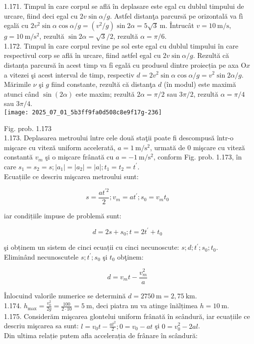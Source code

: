1.171. Timpul în care corpul se află în deplasare este egal cu dublul timpului de urcare, fiind deci egal cu $2 v \sin \alpha / g$. Astfel distanţa parcursă pe orizontală va fì egală cu $2 v^{2} \sin \alpha \cos \alpha / g=\left(v^{2} / g\right) \sin 2 \alpha=5 \sqrt{3} \mathrm{~m}$. Întrucât $v=10 \mathrm{~m} / \mathrm{s}$, $g=10 \mathrm{~m} / \mathrm{s}^{2}$, rezultă $\sin 2 \alpha=\sqrt{3} / 2$, rezultă $\alpha=\pi / 6$.\\
1.172. Timpul în care corpul revine pe sol este egal cu dublul timpului în care respectivul corp se află în urcare, fiind astfel egal cu $2 v \sin \alpha / g$. Rezultă că distanța parcursă în acest timp va fỉ egală cu produsul dintre proiecția pe axa $\mathrm{O} x$ a vitezei şi acest interval de timp, respectiv $d=2 v^{2} \sin \alpha \cos \alpha / g=v^{2} \sin 2 \alpha / g$. Mărimile $\nu$ şi $g$ fiind constante, rezultă că distanţa $d$ (în modul) este maximă atunci când $\sin (2 \alpha)$ este maxim; rezultă $2 \alpha=\pi / 2$ sau $3 \pi / 2$, rezultă $\alpha=\pi / 4$ sau $3 \pi / 4$.\\
\texttt{[image: 2025\_07\_01\_5b3ff9fa0d508c8e9f17g-236]}

Fig. prob. 1.173\\
1.173. Deplasarea metroului între cele două staţii poate fi descompusă într-o mişcare cu viteză uniform accelerată, $a=1 \mathrm{~m} / \mathrm{s}^{2}$, urmată de 0 mişcare cu viteză constantă $v_{m}$ şi o mişcare frânată cu $a=-1 \mathrm{~m} / \mathrm{s}^{2}$, conform Fig. prob. 1.173, în care $s_{1}=s_{2}=s ;\left|a_{1}\right|=\left|a_{2}\right|=|a| ; t_{1}=t_{2}=t^{\prime}$.\\
Ecuațiile ce descriu mişcarea metroului sunt:

$$
s=\frac{a t^{\prime 2}}{2} ; v_{m}=a t^{\prime} ; s_{0}=v_{m} t_{0}
$$

iar condițiile impuse de problemă sunt:

$$
d=2 s+s_{0} ; t=2 t^{\prime}+t_{0}
$$

şi obținem un sistem de cinci ecuații cu cinci necunoscute: $s ; d ; t^{\prime} ; s_{0} ; t_{0}$. Eliminând necunoscutele $s ; t^{\prime} ; s_{0}$ şi $t_{0}$ obţinem:

$$
d=v_{m} t-\frac{v_{m}^{2}}{a}
$$

Înlocuind valorile numerice se determină $d=2750 \mathrm{~m}=2,75 \mathrm{~km}$.\\
1.174. $h_{\max }=\frac{v_{0}^{2}}{2 g}=\frac{100}{2 \cdot 10}=5 \mathrm{~m}$, deci piatra nu va atinge înălțimea $h=10 \mathrm{~m}$.\\
1.175. Considerăm mişcarea glontelui uniform frânată în scândură, iar ecuațiile ce descriu mişcarea sa sunt: $l=v_{0} t-\frac{a t^{2}}{2} ; 0=v_{0}-a t$ şi $0=v_{0}^{2}-2 a l$.\\
Din ultima relație putem afla accelerația de frânare în scândură:

